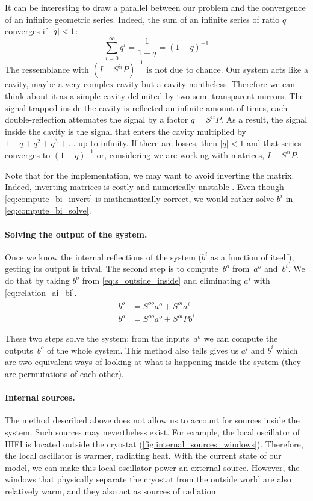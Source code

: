 It can be interesting to draw a parallel between our problem and the convergence of an infinite geometric series.
Indeed, the sum of an infinite series of ratio $q$ converges if $\left| q \right| < 1$:
\begin{equation}
    \sum_{i=0}^\infty q^i = \frac{1}{1-q} = (1-q)^{-1}
\end{equation}
The ressemblance with $(I - S^{ii}P)^{-1}$ is not due to chance.
Our system acts like a cavity, maybe a very complex cavity but a cavity nontheless.
Therefore we can think about it as a simple cavity delimited by two semi-transparent mirrors.
The signal trapped inside the cavity is reflected an infinite amount of times, each double-reflection attenuates the signal by a factor $q=S^{ii}P$.
As a result, the signal inside the cavity is the signal that enters the cavity multiplied by $1+q+q^2+q^3+\dots$ up to infinity.
If there are losses, then $|q|<1$ and that series converges to $(1-q)^{-1}$ or, considering we are working with matrices, $I - S^{ii}P$.

Note that for the implementation, we may want to avoid inverting the matrix.
Indeed, inverting matrices is costly and numerically unstable .
Even though \cref{eq:compute_bi_invert} is mathematically correct, we would rather solve $b^i$ in \cref{eq:compute_bi_solve}.

\paragraph{Solving the output of the system.}
Once we know the internal reflections of the system ($b^i$ as a function of itself), getting its output is trival.
The second step is to compute~$b^o$ from~$a^o$ and~$b^i$.
We do that by taking $b^o$ from \cref{eq:s_outside_inside} and eliminating $a^i$ with \cref{eq:relation_ai_bi}.
\begin{align}
    b^o &= S^{oo}a^o + S^{oi}a^i \\
    b^o &= S^{oo}a^o + S^{oi}Pb^i \label{eq:compute_bo}
\end{align}

These two steps solve the system: from the inputs~$a^o$ we can compute the outputs~$b^o$ of the whole system.
This method also tells gives us $a^i$ and $b^i$ which are two equivalent ways of looking at what is happening inside the system (they are permutations of each other).

\paragraph{Internal sources.}
The method described above does not allow us to account for sources inside the system.
Such sources may nevertheless exist.
For example, the local oscillator of HIFI is located outside the cryostat (\cref{fig:internal_sources_windows}).
Therefore, the local oscillator is warmer, radiating heat.
With the current state of our model, we can make this local oscillator power an external source.
However, the windows that physically separate the cryostat from the outside world are also relatively warm, and they also act as sources of radiation.

